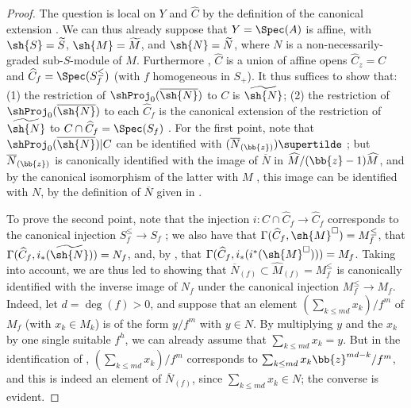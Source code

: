 \begin{proof}
The question is local on $Y$ and $\widehat{C}$ by the definition of the canonical extension .
We can thus already suppose that $Y=\Spec(A)$ is affine, with $\sh{S}=\widetilde{S}$, $\sh{M}=\widetilde{M}$, and $\sh{N}=\widetilde{N}$, where $N$ is a non-necessarily-graded sub-$S$-module of $M$.
Furthermore , $\widehat{C}$ is a union of affine opens $\widehat{C}_z=C$ and $\widehat{C}_f=\Spec(S_f^\leq)$ (with $f$ homogeneous in $S_+$).
It thus suffices to show that: (1) the restriction of $\shProj_0(\overline{\sh{N}})$ to $C$ is $\widetilde{\sh{N}}$; (2) the restriction of $\shProj_0(\overline{\sh{N}})$ to each $\widehat{C}_f$ is the canonical extension of the restriction of $\widetilde{\sh{N}}$ to $C\cap\widehat{C}_f=\Spec(S_f)$ .
For the first point, note that $\shProj_0(\overline{\sh{N}})|C$ can be identified with $(\overline{N}_{(\bb{z})})\supertilde$ ;
but $\overline{N}_{(\bb{z})}$ is canonically identified  with the image of $\overline{N}$ in $\widehat{M}/(\bb{z}-1)\widehat{M}$, and by the canonical isomorphism of the latter with $M$ , this image can be identified with $N$, by the definition of $\overline{N}$ given in .

To prove the second point, note that the injection $i:C\cap\widehat{C}_f\to\widehat{C}_f$ corresponds to the canonical injection $S_f^\leq\to S_f$ ;
we also have that $\Gamma(\widehat{C}_f,\sh{M}^\square)=M_f^\leq$, that $\Gamma(\widehat{C}_f,i_*(\widetilde{\sh{N}}))=N_f$, and, by , that $\Gamma(\widehat{C}_f,i_*(i^*(\sh{M}^\square)))=M_f$.
Taking  into account, we are thus led to showing that $\overline{N}_{(f)}\subset\widehat{M}_{(f)}=M_f^\leq$ is canonically identified with the inverse image of $N_f$ under the canonical injection $M_f^\leq\to M_f$.
Indeed, let $d=\deg(f)>0$, and suppose that an element $(\sum_{k\leq md}x_k)/f^m$ of $M_f$ (with $x_k\in M_k$) is of the form $y/f^m$ with $y\in N$.
By multiplying $y$ and the $x_k$ by one single suitable $f^h$, we can already assume that $\sum_{k\leq md}x_k=y$.
But in the identification of , $(\sum_{k\leq md}x_k)/f^m$ corresponds to $\sum_{k\leq md}x_k\bb{z}^{md-k}/f^m$, and this is indeed an element of $\overline{N}_{(f)}$, since $\sum_{k\leq md}x_k\in N$;
the converse is evident.
\end{proof}

